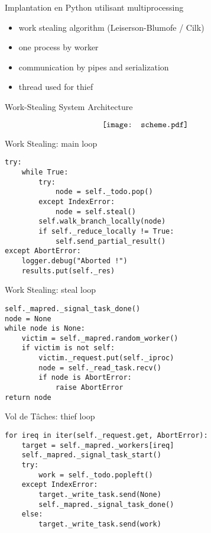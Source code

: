 \documentclass[compress,11pt]{beamer}
\begin{document}
\begin{frame}{Implantation en Python utilisant multiprocessing}

  \begin{itemize}
  \item work stealing algorithm (Leiserson-Blumofe / Cilk)
    \bigskip

  \item one process by worker
    \bigskip

  \item communication by pipes and serialization
    \bigskip

  \item thread used for thief
  \end{itemize}

\end{frame}

\begin{frame}{Work-Stealing System Architecture}

\[\hspace{-0.7cm}\texttt{[image: scheme.pdf]}\]
\end{frame}

\begin{frame}[fragile]{Work Stealing: main loop}
\begin{verbatim}
try:
    while True:
        try:
            node = self._todo.pop()
        except IndexError:
            node = self.steal()
        self.walk_branch_locally(node)
        if self._reduce_locally != True:
            self.send_partial_result()
except AbortError:
    logger.debug("Aborted !")
    results.put(self._res)
\end{verbatim}
\end{frame}

\begin{frame}[fragile]{Work Stealing: steal loop}
\begin{verbatim}
self._mapred._signal_task_done()
node = None
while node is None:
    victim = self._mapred.random_worker()
    if victim is not self:
        victim._request.put(self._iproc)
        node = self._read_task.recv()
        if node is AbortError:
            raise AbortError
return node
\end{verbatim}
\end{frame}

\begin{frame}[fragile]{Vol de Tâches: thief loop}
\begin{verbatim}
for ireq in iter(self._request.get, AbortError):
    target = self._mapred._workers[ireq]
    self._mapred._signal_task_start()
    try:
        work = self._todo.popleft()
    except IndexError:
        target._write_task.send(None)
        self._mapred._signal_task_done()
    else:
        target._write_task.send(work)
\end{verbatim}
\end{frame}
\end{document}
